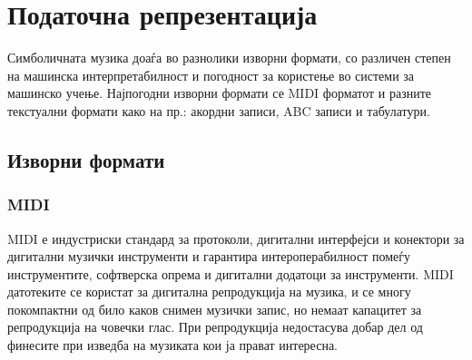 \section{Податочна репрезентација}

Симболичната музика доаѓа во разнолики изворни формати, со различен степен на машинска интерпретабилност и погодност за користење во системи за машинско учење. Најпогодни изворни формати се MIDI форматот и разните текстуални формати како на пр.: акордни записи, ABC записи и табулатури. 

\subsection{Изворни формати}

\subsubsection{MIDI}

MIDI е индустриски стандард за протоколи, дигитални интерфејси и конектори за дигитални музички инструменти и гарантира интероперабилност помеѓу инструментите, софтверска опрема и дигитални додатоци за инструменти. MIDI датотеките се користат за дигитална репродукција на музика, и се многу покомпактни од било каков снимен музички запис, но немаат капацитет за репродукција на човечки глас. При репродукција недостасува добар дел од финесите при изведба на музиката кои ја прават интересна.

